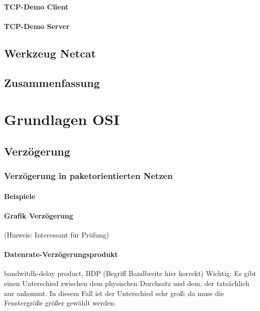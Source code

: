 \subsubsection{TCP-Demo Client}
\subsubsection{TCP-Demo Server}

\section{Werkzeug Netcat}

\section*{Zusammenfassung}

\chapter{Grundlagen OSI}

\section{Verzögerung}

\subsection{Verzögerung in paketorientierten Netzen}

\subsubsection*{Beispiele}

\subsubsection*{Grafik Verzögerung}
(Hinweis: Interessant für Prüfung)

\subsubsection{Datenrate-Verzögerungsprodukt}
bandwitdh-delay product, BDP (Begriff Bandbreite hier korrekt)
Wichtig: Es gibt einen Unterschied zwischen dem physischen Durchsatz und dem, der tatsächlich nur ankommt. In diesem Fall ist der Unterschied sehr groß: da muss die Fenstergröße größer gewählt werden.

